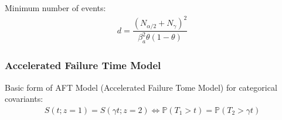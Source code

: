     Minimum number of events:
    \begin{align}
        d=\dfrac{(N_{\alpha /2}+N_\gamma )^2}{\beta _a^2\theta (1-\theta )} 
    \end{align}
    
    
    
    
    
    

    

\subsubsection{Accelerated Failure Time Model}

    Basic form of AFT Model (Accelerated Failure Tome Model) for categorical covariants:
    \begin{align}
        S(t;z=1)=S(\gamma t;z=2)\Leftrightarrow \mathbb{P}\left( T_1>t \right) =\mathbb{P}\left( T_2>\gamma t \right)  
    \end{align}

